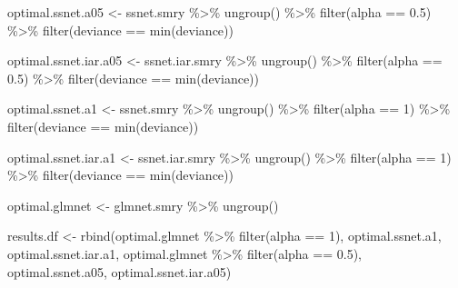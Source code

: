 \documentclass[
]{article}
\newenvironment{Shaded}{\begin{snugshade}}{\end{snugshade}}
\newcommand{\DecValTok}[1]{\textcolor[rgb]{0.00,0.00,0.81}{#1}}
\newcommand{\FloatTok}[1]{\textcolor[rgb]{0.00,0.00,0.81}{#1}}
\newcommand{\FunctionTok}[1]{\textcolor[rgb]{0.00,0.00,0.00}{#1}}
\newcommand{\NormalTok}[1]{#1}
\newcommand{\OtherTok}[1]{\textcolor[rgb]{0.56,0.35,0.01}{#1}}
\newcommand{\SpecialCharTok}[1]{\textcolor[rgb]{0.00,0.00,0.00}{#1}}
\begin{document}
\begin{Shaded}
\begin{Highlighting}[]
\NormalTok{optimal.ssnet.a05 }\OtherTok{\textless{}{-}}\NormalTok{ ssnet.smry }\SpecialCharTok{\%\textgreater{}\%} 
  \FunctionTok{ungroup}\NormalTok{() }\SpecialCharTok{\%\textgreater{}\%}
  \FunctionTok{filter}\NormalTok{(alpha }\SpecialCharTok{==} \FloatTok{0.5}\NormalTok{) }\SpecialCharTok{\%\textgreater{}\%}
  \FunctionTok{filter}\NormalTok{(deviance }\SpecialCharTok{==} \FunctionTok{min}\NormalTok{(deviance))}

\NormalTok{optimal.ssnet.iar.a05 }\OtherTok{\textless{}{-}}\NormalTok{ ssnet.iar.smry }\SpecialCharTok{\%\textgreater{}\%}
  \FunctionTok{ungroup}\NormalTok{() }\SpecialCharTok{\%\textgreater{}\%}
  \FunctionTok{filter}\NormalTok{(alpha }\SpecialCharTok{==} \FloatTok{0.5}\NormalTok{) }\SpecialCharTok{\%\textgreater{}\%}
  \FunctionTok{filter}\NormalTok{(deviance }\SpecialCharTok{==} \FunctionTok{min}\NormalTok{(deviance))}

\NormalTok{optimal.ssnet.a1 }\OtherTok{\textless{}{-}}\NormalTok{ ssnet.smry }\SpecialCharTok{\%\textgreater{}\%} 
  \FunctionTok{ungroup}\NormalTok{() }\SpecialCharTok{\%\textgreater{}\%}
  \FunctionTok{filter}\NormalTok{(alpha }\SpecialCharTok{==} \DecValTok{1}\NormalTok{) }\SpecialCharTok{\%\textgreater{}\%}
  \FunctionTok{filter}\NormalTok{(deviance }\SpecialCharTok{==} \FunctionTok{min}\NormalTok{(deviance))}

\NormalTok{optimal.ssnet.iar.a1 }\OtherTok{\textless{}{-}}\NormalTok{ ssnet.iar.smry }\SpecialCharTok{\%\textgreater{}\%}
  \FunctionTok{ungroup}\NormalTok{() }\SpecialCharTok{\%\textgreater{}\%}
  \FunctionTok{filter}\NormalTok{(alpha }\SpecialCharTok{==} \DecValTok{1}\NormalTok{) }\SpecialCharTok{\%\textgreater{}\%}
  \FunctionTok{filter}\NormalTok{(deviance }\SpecialCharTok{==} \FunctionTok{min}\NormalTok{(deviance))}

\NormalTok{optimal.glmnet }\OtherTok{\textless{}{-}}\NormalTok{ glmnet.smry }\SpecialCharTok{\%\textgreater{}\%}
  \FunctionTok{ungroup}\NormalTok{()}

\NormalTok{results.df }\OtherTok{\textless{}{-}} \FunctionTok{rbind}\NormalTok{(optimal.glmnet }\SpecialCharTok{\%\textgreater{}\%} \FunctionTok{filter}\NormalTok{(alpha }\SpecialCharTok{==} \DecValTok{1}\NormalTok{),}
\NormalTok{                    optimal.ssnet.a1,}
\NormalTok{                    optimal.ssnet.iar.a1,}
\NormalTok{                    optimal.glmnet }\SpecialCharTok{\%\textgreater{}\%} \FunctionTok{filter}\NormalTok{(alpha }\SpecialCharTok{==} \FloatTok{0.5}\NormalTok{),}
\NormalTok{                    optimal.ssnet.a05,}
\NormalTok{                    optimal.ssnet.iar.a05)}
\end{Highlighting}
\end{Shaded}
\end{document}
